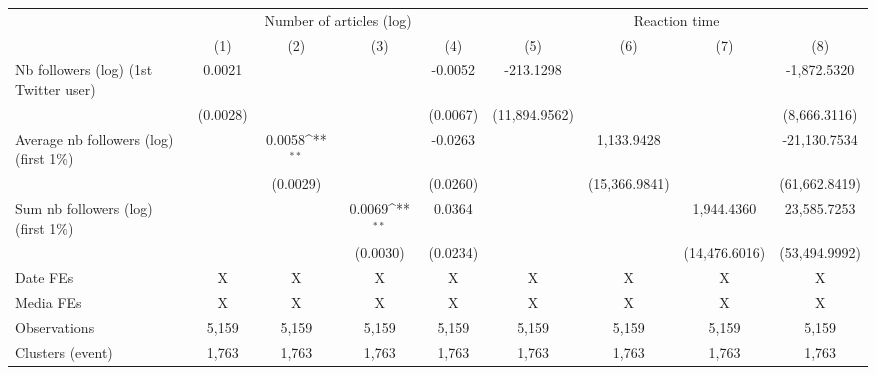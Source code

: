 {
\def\sym#1{\ifmmode^{#1}\else\(^{#1}\)\fi}
\begin{tabular}{l*{8}{c}}
\hline\hline
                    &\multicolumn{4}{c}{Number of articles (log)}                                           &\multicolumn{4}{c}{Reaction time}                                                      \\\cmidrule(lr){2-5}\cmidrule(lr){6-9}
                    &\multicolumn{1}{c}{(1)}         &\multicolumn{1}{c}{(2)}         &\multicolumn{1}{c}{(3)}         &\multicolumn{1}{c}{(4)}         &\multicolumn{1}{c}{(5)}         &\multicolumn{1}{c}{(6)}         &\multicolumn{1}{c}{(7)}         &\multicolumn{1}{c}{(8)}         \\
\hline
Nb followers (log) (1st Twitter user)&      0.0021         &                     &                     &     -0.0052         &   -213.1298         &                     &                     & -1,872.5320         \\
                    &    (0.0028)         &                     &                     &    (0.0067)         &(11,894.9562)         &                     &                     &(8,666.3116)         \\
Average nb followers (log) (first 1$\%$)&                     &      0.0058\sym{**} &                     &     -0.0263         &                     &  1,133.9428         &                     &-21,130.7534         \\
                    &                     &    (0.0029)         &                     &    (0.0260)         &                     &(15,366.9841)         &                     &(61,662.8419)         \\
Sum nb followers (log) (first 1$\%$)&                     &                     &      0.0069\sym{**} &      0.0364         &                     &                     &  1,944.4360         & 23,585.7253         \\
                    &                     &                     &    (0.0030)         &    (0.0234)         &                     &                     &(14,476.6016)         &(53,494.9992)         \\
\hline
Date FEs            &           X         &           X         &           X         &           X         &           X         &           X         &           X         &           X         \\
Media FEs           &           X         &           X         &           X         &           X         &           X         &           X         &           X         &           X         \\
Observations        &       5,159         &       5,159         &       5,159         &       5,159         &       5,159         &       5,159         &       5,159         &       5,159         \\
Clusters (event)    &       1,763         &       1,763         &       1,763         &       1,763         &       1,763         &       1,763         &       1,763         &       1,763         \\
\hline\hline
\end{tabular}
}
